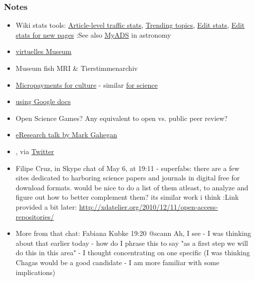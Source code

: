 \documentclass[final,authoryear,3p]{elsarticle-open-drafting}
\begin{document}
\subsubsection{Notes}
\begin{itemize}
	\item Wiki stats tools: \href{http://stats.grok.se/en/201101/Magnetic resonance imaging}{Article-level traffic stats}, \href{http://www.trendingtopics.org/page/Magnetic_resonance_imaging}{Trending topics}, \href{http://www.wikirage.com/}{Edit stats}, \href{http://unit1.conus.info:8080/en.wikipedia.stats/}{Edit stats for new pages}
:See also \href{http://adsabs.harvard.edu/myADS/cache/278851069_PRE.html}{MyADS} in astronomy
	\item \href{http://de.guttenplag.wikia.com/wiki/Benutzer_Blog:Mr._Nice/Quo_vadis,_GuttenPlag}{virtuelles Museum}
	\item Museum fish MRI \& Tierstimmenarchiv
	\item \href{http://ff.im/CCtKf}{Micropayments for culture}  - similar \href{http://friendfeed.com/open-science-summit-2010/a3a7a6ca/sciflies-microfinancing-for-science}{for science}
	\item \href{http://chronicle.com/blogs/profhacker/using-google-docs-forms-to-run-a-peer-review-writing-workshop/33107}{using Google docs}
	\item Open Science Games? Any equivalent to open vs. public peer review?
	\item \href{http://friendfeed.com/kubke/ae9078a8/rt-bestgrid-6pm-tonight-streaming-live}{eResearch talk by Mark Gahegan}
	\item \href{http://museumgam.es/ Museum metadata games}, via \href{http://twitter.com/mia_out}{Twitter}
	\item Filipe Cruz, in Skype chat of May 6, at 19:11 - superfabs: there are a few sites dedicated to harboring science papers and journals in digital free for download formats. would be nice to do a list of them atleast, to analyze and figure out how to better complement them? its similar work i think
:Link provided a bit later: \href{http://xdatelier.org/2010/12/11/open-access-repositories/}{http://xdatelier.org/2010/12/11/open-access-repositories/}
	\item More from that chat: Fabiana Kubke 19:20 
@scann Ah, I see - I was thinking about that earlier today - how do I phrase this to say "as a first step we will do this in this area" - I thought concentrating on one specific (I was thinking Chagas would be a good candidate - I am more familiar with some implications)

\end{itemize}
\end{document}
